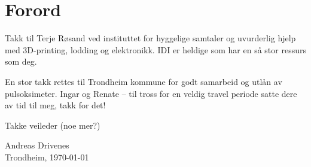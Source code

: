 \chapter*{Forord}
Takk til Terje Røsand ved instituttet for hyggelige samtaler og uvurderlig hjelp med 3D-printing, lodding og elektronikk.
IDI er heldige som har en så stor ressurs som deg.

En stor takk rettes til Trondheim kommune for godt samarbeid og utlån av pulsoksimeter.
Ingar og Renate -- til tross for en veldig travel periode satte dere av tid til meg, takk for det!

Takke veileder (noe mer?)

\begin{flushright}
Andreas Drivenes\\[0.8pc]
Trondheim, \today
\end{flushright}
\thispagestyle{empty}

\clearpage